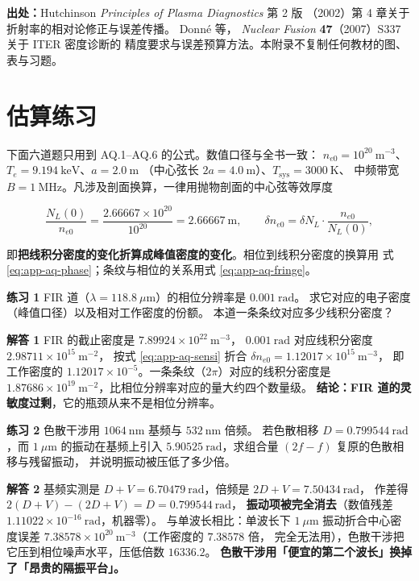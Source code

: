 {\footnotesize
\textbf{出处：}Hutchinson \textit{Principles of Plasma Diagnostics} 第 2 版
（2002）第 4 章关于折射率的相对论修正与误差传播。
Donné 等，
\textit{Nuclear Fusion} \textbf{47}（2007）S337 关于 ITER 密度诊断的
精度要求与误差预算方法。本附录不复制任何教材的图、表与习题。
\section{估算练习}
\label{sec:app-aq-problems}
}

下面六道题只用到 AQ.1--AQ.6 的公式。数值口径与全书一致：
$n_{e0} = 10^{20}\ \mathrm{m^{-3}}$、$T_e = 9.194\ \mathrm{keV}$、$a = 2.0\ \mathrm{m}$
（中心弦长 $2a = 4.0\ \mathrm{m}$）、$T_{\mathrm{sys}} = 3000\ \mathrm{K}$、
中频带宽 $B = 1\ \mathrm{MHz}$。凡涉及剖面换算，一律用抛物剖面的中心弦等效厚度

\begin{equation}
\frac{N_L(0)}{n_{e0}} = \frac{2.66667\times10^{20}}{10^{20}} = 2.66667\ \mathrm{m},
\qquad
\delta n_{e0} = \delta N_L\cdot\frac{n_{e0}}{N_L(0)},
\label{eq:app-aq-sensi}
\end{equation}

即\textbf{把线积分密度的变化折算成峰值密度的变化}。相位到线积分密度的换算用
式 \eqref{eq:app-aq-phase}；条纹与相位的关系用式 \eqref{eq:app-aq-fringe}。

\textbf{练习 1}
FIR 道（$\lambda = 118.8\ \mu\mathrm{m}$）的相位分辨率是 $0.001\ \mathrm{rad}$。
求它对应的电子密度（峰值口径）以及相对工作密度的份额。
本道一条条纹对应多少线积分密度？

\textbf{解答 1}
FIR 的截止密度是 $7.89924\times10^{22}\ \mathrm{m^{-3}}$，
$0.001\ \mathrm{rad}$ 对应线积分密度 $2.98711\times10^{15}\ \mathrm{m^{-2}}$，
按式 \eqref{eq:app-aq-sensi} 折合 $\delta n_{e0} = 1.12017\times10^{15}\ \mathrm{m^{-3}}$，
即工作密度的 $1.12017\times10^{-5}$。一条条纹（$2\pi$）对应的线积分密度是
$1.87686\times10^{19}\ \mathrm{m^{-2}}$，比相位分辨率对应的量大约四个数量级。
\textbf{结论：FIR 道的灵敏度过剩}，它的瓶颈从来不是相位分辨率。

\textbf{练习 2}
色散干涉用 $1064\ \mathrm{nm}$ 基频与 $532\ \mathrm{nm}$ 倍频。
若色散相移 $D = 0.799544\ \mathrm{rad}$，而 $1\ \mu\mathrm{m}$ 的振动在基频上引入
$5.90525\ \mathrm{rad}$，求组合量 $(2f - f)$ 复原的色散相移与残留振动，
并说明振动被压低了多少倍。

\textbf{解答 2}
基频实测是 $D + V = 6.70479\ \mathrm{rad}$，倍频是 $2D + V = 7.50434\ \mathrm{rad}$，
作差得 $2(D+V) - (2D+V) = D = 0.799544\ \mathrm{rad}$，
\textbf{振动项被完全消去}（数值残差 $1.11022\times10^{-16}\ \mathrm{rad}$，机器零）。
与单波长相比：单波长下 $1\ \mu\mathrm{m}$ 振动折合中心密度误差
$7.38578\times10^{20}\ \mathrm{m^{-3}}$（工作密度的 $7.38578$ 倍，
完全无法用），色散干涉把它压到相位噪声水平，压低倍数 $16336.2$。
\textbf{色散干涉用「便宜的第二个波长」换掉了「昂贵的隔振平台」。}

